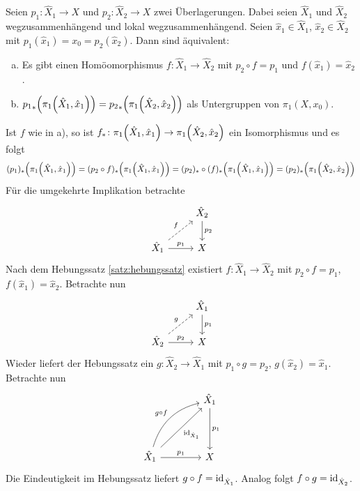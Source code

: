 \begin{satz}[{name={Eindeutigkeit}}]
	Seien $p_1 \colon \hat{X}_1 \to X$ und $p_2 \colon \hat{X}_2 \to X$ zwei Überlagerungen. 
	Dabei seien $\hat{X}_1$ und $\hat{X}_2$ wegzusammenhängend und lokal wegzusammenhängend.
	Seien $\hat{x}_1 \in \hat{X}_1$, $\hat{x}_2 \in \hat{X}_2$ mit $p_1(\hat{x}_1) = x_0 = p_2(\hat{x}_2)$.
	Dann sind äquivalent:
	\begin{enumerate}[a)]
		\item Es gibt einen Homöomorphismus $f \colon \hat{X}_1 \to \hat{X}_2$ mit $p_2 \circ f = p_1$ und $f(\hat{x}_1) = \hat{x}_2$.
		\item ${p_1}_*\enbrace*{\pi_1 \enbrace*{\hat{X}_1, \hat{x}_1}} = {p_2}_* \enbrace*{\pi_1 \enbrace*{\hat{X}_2, \hat{x}_2}}$ als Untergruppen von $\pi_1(X,x_0)$.
	\end{enumerate}
\end{satz}
\begin{beweis}
	Ist $f$ wie in a), so ist $f_* \colon \pi_1 \enbrace*{\hat{X}_1, \hat{x}_1} \to \pi_1 \enbrace*{\hat{X}_2, \hat{x}_2}$ ein Isomorphismus und es folgt 
	\[
		(p_1)_* \enbrace*{\pi_1 \enbrace*{\hat{X}_1, \hat{x}_1}} =  (p_2 \circ f)_* \enbrace*{\pi_1 \enbrace*{\hat{X}_1, \hat{x}_1}} 
		= (p_2)_* \circ (f)_* \enbrace*{\pi_1 \enbrace*{\hat{X}_1, \hat{x}_1}} = (p_2)_* \enbrace*{\pi_1 \enbrace*{\hat{X}_2, \hat{x}_2}}
	\]
	Für die umgekehrte Implikation betrachte
	\[
		\begin{tikzcd}
			\mbox{ } & \hat{X}_2 \dar{p_2}\\
			\hat{X}_1 \rar{p_1} \urar[dashed]{f}& X
		\end{tikzcd}
	\]
	Nach dem Hebungssatz \ref{satz:hebungssatz} existiert $f \colon \hat{X}_1 \to \hat{X}_2$ mit $p_2 \circ f = p_1$, $f(\hat{x}_1) = \hat{x}_2$. Betrachte nun
	\[
		\begin{tikzcd}
			\mbox{} & \hat{X}_1\dar{p_1} \\
			\hat{X}_2 \rar{p_2} \urar[dashed]{g}&  X
		\end{tikzcd}
	\]
	Wieder liefert der Hebungssatz ein $g \colon \hat{X}_2 \to \hat{X}_1$ mit $p_1 \circ  g = p_2$, $g(\hat{x}_2) = \hat{x}_1$. Betrachte nun
	\[
		\begin{tikzcd}[column sep=4em, row sep=4em]
			\mbox{ } & \hat{X}_1 \dar{p_1}\\
			\hat{X}_1 \rar{p_1} \urar[swap]{\id_{\hat{X}_1}} \urar[bend left]{g \circ f} & X
		\end{tikzcd}
	\]
	Die Eindeutigkeit im Hebungssatz liefert $g \circ f = \operatorname{id}_{\hat{X}_1}$. Analog folgt $f \circ g = \operatorname{id}_{\hat{X}_2}$.
\end{beweis}

